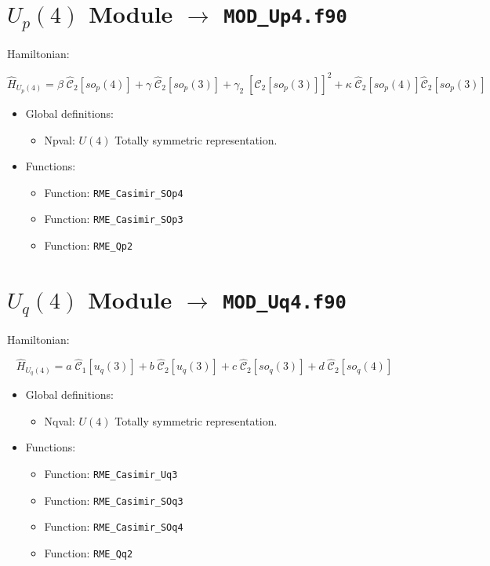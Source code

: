 \documentclass[english,twoside, openright]{report}
\newcommand{\cas}[2]{
  \hat{\mathcal{C}}_{#1}\left[#2\right]
}
\begin{document}
\section{$U_p(4)$ Module $\rightarrow$ \texttt{MOD\_Up4.f90}}
Hamiltonian:

\begin{equation}
  \hat{H}_{U_p(4)} = \beta \; \cas{2}{so_p(4)} + \gamma \; \cas{2}{so_p(3)} + \gamma_2 \; \left[\cas{2}{so_p(3)}\right]^2 + \kappa \; \cas{2}{so_p(4)}\cas{2}{so_p(3)}
\end{equation}

\begin{itemize}
\item Global definitions:
  \begin{itemize}
  \item Npval: $U(4)$ Totally symmetric representation.
  \end{itemize}
\item Functions:
  \begin{itemize}
  \item Function: \texttt{RME\_Casimir\_SOp4}
  \item Function: \texttt{RME\_Casimir\_SOp3}
  \item Function: \texttt{RME\_Qp2}
  \end{itemize}
\end{itemize}

\section{$U_q(4)$ Module $\rightarrow$ \texttt{MOD\_Uq4.f90}}

Hamiltonian:

\begin{equation}
  \hat{H}_{U_q(4)} = a \; \cas{1}{u_q(3)} + b \; \cas{2}{u_q(3)} + c \; \cas{2}{so_q(3)} + d \; \cas{2}{so_q(4)}
\end{equation}

\begin{itemize}
\item Global definitions:
  \begin{itemize}
  \item Nqval: $U(4)$ Totally symmetric representation.
  \end{itemize}
\item Functions:
  \begin{itemize}
  \item Function: \texttt{RME\_Casimir\_Uq3}
  \item Function: \texttt{RME\_Casimir\_SOq3}
  \item Function: \texttt{RME\_Casimir\_SOq4}
  \item Function: \texttt{RME\_Qq2}
  \end{itemize}
\end{itemize}
\end{document}
